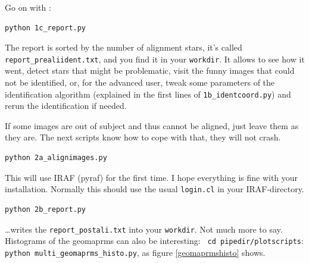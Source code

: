 Go on with :

\begin{Verbatim}
python 1c_report.py
\end{Verbatim}

The report is sorted by the number of alignment stars, it's called
\verb+report_prealiident.txt+, and you find it in your \verb+workdir+. It allows
to see how it went, detect stars that might be problematic, visit the funny
images that could not be identified, or, for the advanced user, tweak some
parameters of the identification algorithm (explained in the first lines of
\verb+1b_identcoord.py+) and rerun the identification if needed.


If some images are out of subject and thus cannot be aligned, just leave them as they are. The next scripts know how to cope with that, they will not crash.

\begin{Verbatim}
python 2a_alignimages.py
\end{Verbatim}

This will use IRAF (pyraf) for the first time. I hope everything is fine with your installation. Normally this should use the usual \verb+login.cl+ in your IRAF-directory.


\begin{Verbatim}
python 2b_report.py
\end{Verbatim}

\ldots writes the \verb+report_postali.txt+ into your \verb+workdir+. Not much more to say. Histograms of the geomaprms can also be interesting: \verb+ cd pipedir/plotscripts+:\\ \verb+python multi_geomaprms_histo.py+, as figure \ref{geomaprmshisto} shows. 

